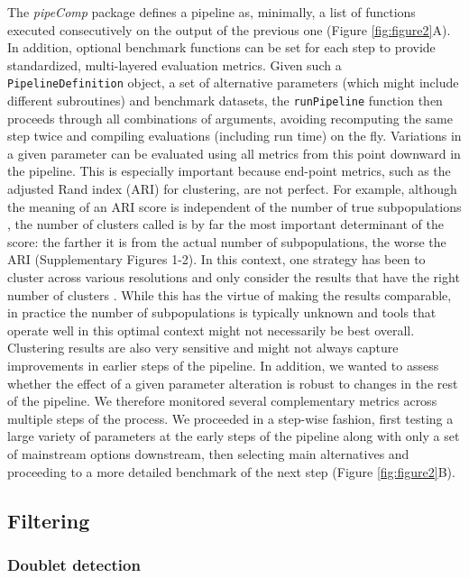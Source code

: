 \documentclass{bmcart}
\begin{document}
The \textit{pipeComp} package defines a pipeline as, minimally, a list of functions executed consecutively on the output of the previous one (Figure \ref{fig:figure2}A). In addition, optional benchmark functions can be set for each step to provide standardized, multi-layered evaluation metrics. Given such a \texttt{PipelineDefinition} object, a set of alternative parameters (which might include different subroutines) and benchmark datasets, the \texttt{runPipeline} function then proceeds through all combinations of arguments, avoiding recomputing the same step twice and compiling evaluations (including run time) on the fly. Variations in a given parameter can be evaluated using all metrics from this point downward in the pipeline. This is especially important because end-point metrics, such as the adjusted Rand index (ARI) \cite{HubertARI1985} for clustering, are not perfect. For example, although the meaning of an ARI score is independent of the number of true subpopulations \cite{steinleyProperties2004}, the number of clusters called is by far the most important determinant of the score: the farther it is from the actual number of subpopulations, the worse the ARI (Supplementary Figures 1-2). In this context, one strategy has been to cluster across various resolutions and only consider the results that have the right number of clusters \cite{duoClustering2018}. While this has the virtue of making the results comparable, in practice the number of subpopulations is typically unknown and tools that operate well in this optimal context might not necessarily be best overall. Clustering results are also very sensitive and might not always capture improvements in earlier steps of the pipeline. In addition, we wanted to assess whether the effect of a given parameter alteration is robust to changes in the rest of the pipeline. We therefore monitored several complementary metrics across multiple steps of the process. We proceeded in a step-wise fashion, first testing a large variety of parameters at the early steps of the pipeline along with only a set of mainstream options downstream, then selecting main alternatives and proceeding to a more detailed benchmark of the next step (Figure \ref{fig:figure2}B).

\subsection*{Filtering}

\subsubsection*{Doublet detection}
\end{document}
